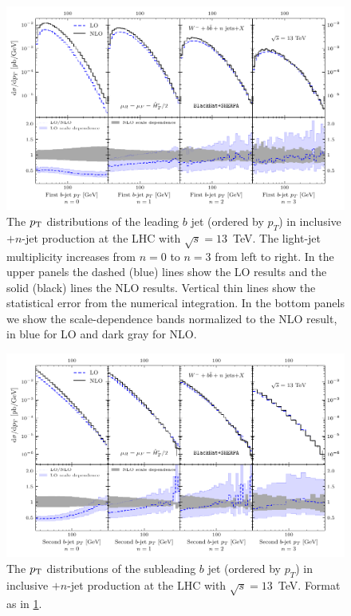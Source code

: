 \begin{figure}[ht]
  \centering
  \includegraphics[clip,scale=1]{plots/ptleading}
  \caption{The $p_{\textrm T}$ distributions of the leading $b$ jet (ordered by $p_T$) in inclusive \Wbbm$+n$-jet
    production at the LHC with $\sqrt{s}=13$~TeV. The light-jet multiplicity 
    increases from $n=0$ to $n=3$ from left to right. In the upper panels the
    dashed (blue) lines show the LO results and the solid (black) lines the NLO
    results. Vertical thin lines show the statistical error from the numerical
    integration. In the bottom panels we show the scale-dependence bands
  normalized to the NLO result, in blue for LO and dark gray for NLO.}
  \label{fig_Wmnjpt}
\end{figure}

\begin{figure}[ht]
  \centering
  \includegraphics[clip,scale=1]{plots/ptsubleading}
  \caption{The $p_{\textrm T}$ distributions of the subleading $b$ jet (ordered by $p_T$) in inclusive \Wbbm$+n$-jet
    production at the LHC with $\sqrt{s}=13$~TeV. Format as in \cref{fig_Wmnjpt}.}
    \label{fig_Wmnjpt2}
  \end{figure}

